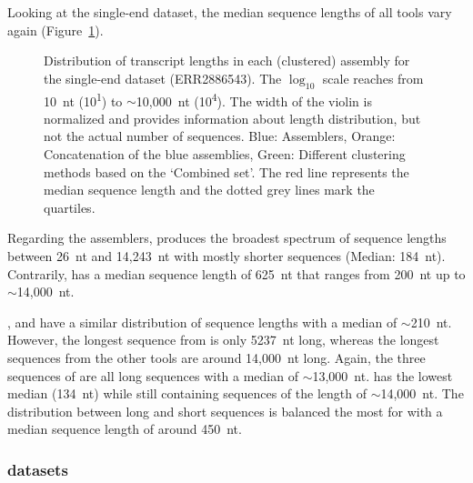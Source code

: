 \documentclass[12pt,a4paper,english]{article}
\begin{document}
    Looking at the single-end dataset, the median sequence lengths of all tools vary again (Figure~\ref{img:violin:cel_ERR2886543}).
    \begin{figure}[H]
    	\centering
    	\def\svgwidth{\textwidth}
    	
    	\caption[Distribution of transcript lengths per assembly (SE, ERR2886543)]{Distribution of transcript lengths in each (clustered) assembly for the single-end \celegans dataset (ERR2886543). The $\log_{10}$ scale reaches from 10~nt (10\textsuperscript{1}) to $\sim$10,000~nt (10\textsuperscript{4}). The width of the violin is normalized and provides information about length distribution, but not the actual number of sequences. Blue: Assemblers, Orange: Concatenation of the blue assemblies, Green: Different clustering methods based on the `Combined set'. The red line represents the median sequence length and the dotted grey lines mark the quartiles.}
    	\label{img:violin:cel_ERR2886543}
    \end{figure}
	Regarding the assemblers, \soap produces the broadest spectrum of sequence lengths between 26~nt and 14,243~nt with mostly shorter sequences (Median: 184~nt). Contrarily, \trinity has a median sequence length of 625~nt that ranges from 200~nt up to $\sim$14,000~nt.
	
	\cdhit, \linclust and \mclust have a similar distribution of sequence lengths with a median of $\sim$210~nt. However, the longest sequence from \mclust is only 5237~nt long, whereas the longest sequences from the other tools are around 14,000~nt long.
	Again, the three sequences of \grouper are all long sequences with a median of $\sim$13,000~nt.
	\mclusttwo has the lowest median (134~nt) while still containing sequences of the length of $\sim$14,000~nt.
	The distribution between long and short sequences is balanced the most for \karma with a median sequence length of around 450~nt.



\subsubsection*{\ecoli datasets}
\end{document}
